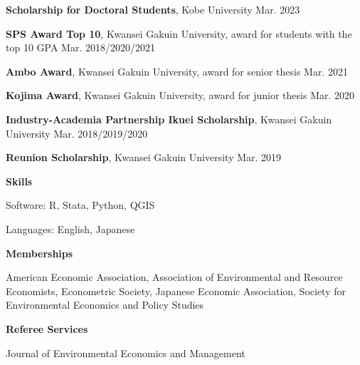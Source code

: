 \documentclass{article}
\begin{document}
\textbf{Scholarship for Doctoral Students}, Kobe University \hspace{\fill} Mar. 2023

\textbf{SPS Award Top 10}, Kwansei Gakuin University, award for students with the top 10 GPA \hspace{\fill} Mar. 2018/2020/2021

\textbf{Ambo Award}, Kwansei Gakuin University, award for senior thesis \hspace{\fill} Mar. 2021

\textbf{Kojima Award}, Kwansei Gakuin University, award for junior thesis \hspace{\fill} Mar. 2020

\textbf{Industry-Academia Partnership Ikuei Scholarship}, Kwansei Gakuin University \hspace{\fill} Mar. 2018/2019/2020

\textbf{Reunion Scholarship}, Kwansei Gakuin University \hspace{\fill} Mar. 2019

\hrulefill

\begin{flushleft}
  \textbf{\large{Skills}}
\end{flushleft}

Software: R, Stata, Python, QGIS

Languages: English, Japanese

\hrulefill

\begin{flushleft}
  \textbf{\large{Memberships}}
\end{flushleft}

American Economic Association,
Association of Environmental and Resource Economists,
Econometric Society,
Japanese Economic Association,
Society for Environmental Economics and Policy Studies

\hrulefill

\begin{flushleft}
  \textbf{\large{Referee Services}}
\end{flushleft}

Journal of Environmental Economics and Management
\end{document}
